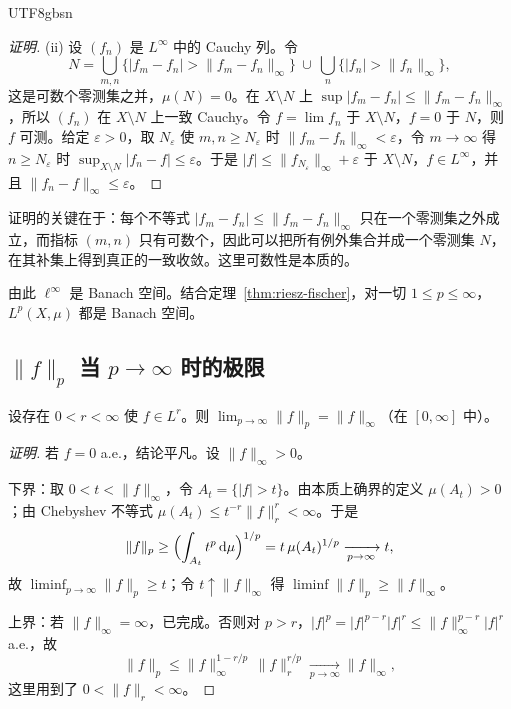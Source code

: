 \documentclass[11pt]{article}
\newcommand{\norm}[1]{\lVert #1\rVert}
\newcommand{\dmu}{\,\mathrm{d}\mu}
\begin{document}
\begin{CJK*}{UTF8}{gbsn}
\begin{proof}[证明]
(ii) 设 $(f_{n})$ 是 $L^{\infty}$ 中的 Cauchy 列。令
\[
N=\bigcup_{m,n}\bigl\{|f_{m}-f_{n}|>\norm{f_{m}-f_{n}}_{\infty}\bigr\}\ \cup\ \bigcup_{n}\bigl\{|f_{n}|>\norm{f_{n}}_{\infty}\bigr\},
\]
这是可数个零测集之并，$\mu(N)=0$。在 $X\setminus N$ 上 $\sup|f_{m}-f_{n}|\le\norm{f_{m}-f_{n}}_{\infty}$，所以 $(f_{n})$ 在 $X\setminus N$ 上一致 Cauchy。令 $f=\lim f_{n}$ 于 $X\setminus N$，$f=0$ 于 $N$，则 $f$ 可测。给定 $\varepsilon>0$，取 $N_{\varepsilon}$ 使 $m,n\ge N_{\varepsilon}$ 时 $\norm{f_{m}-f_{n}}_{\infty}<\varepsilon$，令 $m\to\infty$ 得 $n\ge N_{\varepsilon}$ 时 $\sup_{X\setminus N}|f_{n}-f|\le\varepsilon$。于是 $|f|\le\norm{f_{N_{\varepsilon}}}_{\infty}+\varepsilon$ 于 $X\setminus N$，$f\in L^{\infty}$，并且 $\norm{f_{n}-f}_{\infty}\le\varepsilon$。
\end{proof}

\begin{remark}
证明的关键在于：每个不等式 $|f_{m}-f_{n}|\le\norm{f_{m}-f_{n}}_{\infty}$ 只在一个零测集之外成立，而指标 $(m,n)$ 只有可数个，因此可以把所有例外集合并成一个零测集 $N$，在其补集上得到真正的一致收敛。这里可数性是本质的。
\end{remark}

由此 $\ell^{\infty}$ 是 Banach 空间。结合定理~\ref{thm:riesz-fischer}，对一切 $1\le p\le\infty$，$L^{p}(X,\mu)$ 都是 Banach 空间。

\subsection{$\norm{f}_{p}$ 当 $p\to\infty$ 时的极限}

\begin{theorem}\label{thm:p-to-infty}
设存在 $0<r<\infty$ 使 $f\in L^{r}$。则 $\lim_{p\to\infty}\norm{f}_{p}=\norm{f}_{\infty}$（在 $[0,\infty]$ 中）。
\end{theorem}

\begin{proof}[证明]
若 $f=0$ a.e.，结论平凡。设 $\norm{f}_{\infty}>0$。

下界：取 $0<t<\norm{f}_{\infty}$，令 $A_{t}=\{|f|>t\}$。由本质上确界的定义 $\mu(A_{t})>0$；由 Chebyshev 不等式 $\mu(A_{t})\le t^{-r}\norm{f}_{r}^{r}<\infty$。于是
\[
\norm{f}_{p}\ge\Bigl(\int_{A_{t}}t^{p}\dmu\Bigr)^{1/p}=t\,\mu(A_{t})^{1/p}\xrightarrow[p\to\infty]{}t,
\]
故 $\liminf_{p\to\infty}\norm{f}_{p}\ge t$；令 $t\uparrow\norm{f}_{\infty}$ 得 $\liminf\norm{f}_{p}\ge\norm{f}_{\infty}$。

上界：若 $\norm{f}_{\infty}=\infty$，已完成。否则对 $p>r$，$|f|^{p}=|f|^{p-r}|f|^{r}\le\norm{f}_{\infty}^{p-r}|f|^{r}$ a.e.，故
\[
\norm{f}_{p}\le\norm{f}_{\infty}^{1-r/p}\,\norm{f}_{r}^{r/p}\xrightarrow[p\to\infty]{}\norm{f}_{\infty},
\]
这里用到了 $0<\norm{f}_{r}<\infty$。
\end{proof}


\end{CJK*}
\end{document}

